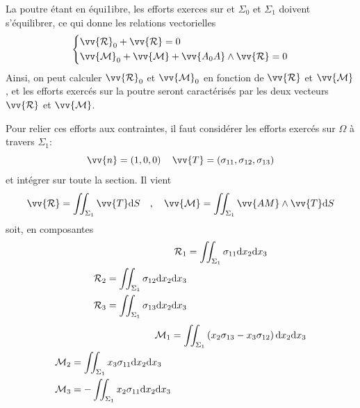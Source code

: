 La poutre étant en équi1ibre, les efforts exerces sur et $\Sigma_0$ et $\Sigma_1$ doivent s'équilibrer, ce qui donne les relations vectorielles
\begin{equation}
    \left\{
    \begin{aligned}
        & \vv{\mathcal{R}}_0 + \vv{\mathcal{R}} = 0 \\
        & \vv{\mathcal{M}}_0 + \vv{\mathcal{M}} + \vv{A_0 A} \wedge  \vv{\mathcal{R}} = 0
    \end{aligned}
    \right.
    \label{eq:Ch07-002}
\end{equation}
Ainsi, on peut calculer $\vv{\mathcal{R}}_0$ et $\vv{\mathcal{M}}_0$ en fonction de $\vv{\mathcal{R}}$ et $\vv{\mathcal{M}}$, et les efforts exercés sur la poutre seront caractérisés par les deux vecteurs $\vv{\mathcal{R}}$ et $\vv{\mathcal{M}}$.

Pour relier ces efforts aux contraintes, il faut considérer les efforts exercés sur $\Omega$ à travers  $\Sigma_1$:
\begin{equation}
    \vv{n} = \left( 1,0,0 \right) \quad \vv{T} = \left( \sigma_{11}, \sigma_{12}, \sigma_{13} \right)
    \label{eq:Ch07-003}
\end{equation}
et intégrer sur toute la section.
Il vient
\begin{equation}
    \vv{\mathcal{R}} = \iint_{\Sigma_1} \vv{T} \ud S \quad,\quad \vv{\mathcal{M}} = \iint_{\Sigma_1} \vv{AM} \wedge \vv{T} \ud S
    \label{eq:Ch07-004}
\end{equation}
soit, en composantes
\begin{align}
    \mathcal{R}_1 &= \iint_{\Sigma_1} \sigma_{11} \mathrm{d} x_2 \mathrm{d} x_3    \label{eq:Ch07-005} \\
    \begin{split}
        \mathcal{R}_2 &= \iint_{\Sigma_1} \sigma_{12} \mathrm{d} x_2 \mathrm{d} x_3 \\
        \mathcal{R}_3 &= \iint_{\Sigma_1} \sigma_{13} \mathrm{d} x_2 \mathrm{d} x_3    \label{eq:Ch07-006}
    \end{split}
\end{align}
\begin{align}
    \mathcal{M}_1 &= \iint_{\Sigma_1} \left( x_2\sigma_{13} - x_3\sigma_{12} \right) \mathrm{d} x_2 \mathrm{d} x_3    \label{eq:Ch07-007} \\
    \begin{split}
        \mathcal{M}_2 &= \iint_{\Sigma_1} x_3\sigma_{11} \mathrm{d} x_2 \mathrm{d} x_3 \\
        \mathcal{M}_3 &= -\iint_{\Sigma_1} x_2\sigma_{11} \mathrm{d} x_2 \mathrm{d} x_3    \label{eq:Ch07-008}
    \end{split}
\end{align}


